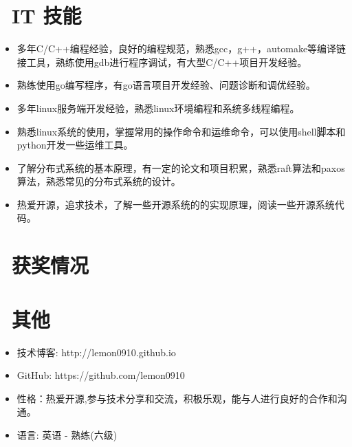 \documentclass{resume}
\begin{document}
\section{\faCogs\ IT 技能}
\begin{itemize}[parsep=0.5ex]
  \item 多年C/C++编程经验，良好的编程规范，熟悉gcc，g++，automake等编译链接工具，熟练使用gdb进行程序调试，有大型C/C++项目开发经验。
  \item 熟练使用go编写程序，有go语言项目开发经验、问题诊断和调优经验。
  \item 多年linux服务端开发经验，熟悉linux环境编程和系统多线程编程。
  \item 熟悉linux系统的使用，掌握常用的操作命令和运维命令，可以使用shell脚本和python开发一些运维工具。
  \item 了解分布式系统的基本原理，有一定的论文和项目积累，熟悉raft算法和paxos算法，熟悉常见的分布式系统的设计。
  \item 热爱开源，追求技术，了解一些开源系统的的实现原理，阅读一些开源系统代码。
\end{itemize}

\section{\faHeartO\ 获奖情况}

\section{\faInfo\ 其他}
\begin{itemize}[parsep=0.5ex]
  \item 技术博客: http://lemon0910.github.io
  \item GitHub: https://github.com/lemon0910
  \item 性格：热爱开源,参与技术分享和交流，积极乐观，能与人进行良好的合作和沟通。
  \item 语言: 英语 - 熟练(六级)
\end{itemize}

%
%
\end{document}
